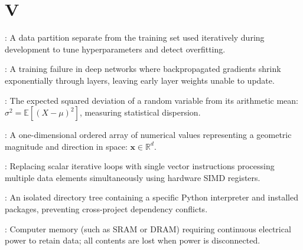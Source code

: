 \section*{V}
\begin{description}[leftmargin=!,labelwidth=4.5cm,itemsep=1.5ex]
\item[\textbf{Validation Set}\hfill \textnormal{\sffamily\scriptsize\color{keyideablue}[Evaluation]}]: A data partition separate from the training set used iteratively during development to tune hyperparameters and detect overfitting.
\item[\textbf{Vanishing Gradient Problem}\hfill \textnormal{\sffamily\scriptsize\color{keyideablue}[Deep Learning]}]: A training failure in deep networks where backpropagated gradients shrink exponentially through layers, leaving early layer weights unable to update.
\item[\textbf{Variance}\hfill \textnormal{\sffamily\scriptsize\color{keyideablue}[Statistics]}]: The expected squared deviation of a random variable from its arithmetic mean: $\sigma^2 = \mathbb{E}[(X - \mu)^2]$, measuring statistical dispersion.
\item[\textbf{Vector}\hfill \textnormal{\sffamily\scriptsize\color{keyideablue}[Mathematics]}]: A one-dimensional ordered array of numerical values representing a geometric magnitude and direction in space: $\mathbf{x} \in \mathbb{R}^d$.
\item[\textbf{Vectorization (SIMD)}\hfill \textnormal{\sffamily\scriptsize\color{keyideablue}[Software Engineering]}]: Replacing scalar iterative loops with single vector instructions processing multiple data elements simultaneously using hardware SIMD registers.
\item[\textbf{Virtual Environment}\hfill \textnormal{\sffamily\scriptsize\color{keyideablue}[Software Engineering]}]: An isolated directory tree containing a specific Python interpreter and installed packages, preventing cross-project dependency conflicts.
\item[\textbf{Volatile Memory}\hfill \textnormal{\sffamily\scriptsize\color{keyideablue}[IoT \& Hardware]}]: Computer memory (such as SRAM or DRAM) requiring continuous electrical power to retain data; all contents are lost when power is disconnected.
\end{description}

